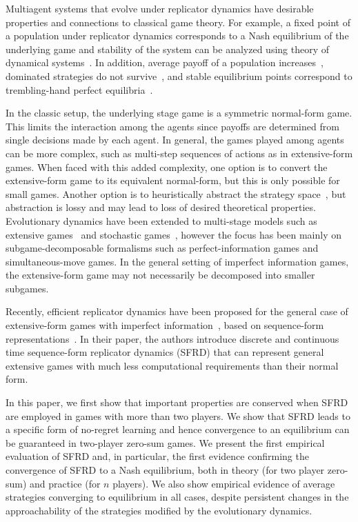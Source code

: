 \documentclass{aamas2014}
\begin{document}
Multiagent systems that evolve under replicator dynamics have desirable properties and connections to classical game theory. 
For example, a fixed point of a population under replicator dynamics corresponds to a Nash equilibrium of the underlying  
game and stability of the system can be analyzed using theory of dynamical systems~\cite{FudLev98,Gintis09}. 
In addition, average payoff of a population increases~\cite{HS98}, dominated strategies do not survive~\cite{Gintis09}, and 
stable equilibrium points correspond to trembling-hand perfect equilibria~\cite{FudLev98,ShoLB08}.

In the classic setup, the underlying stage game is a symmetric normal-form game. This limits the interaction
among the agents since payoffs are determined from single decisions made by each agent. In general, the games played among agents 
can be more complex, such as multi-step sequences of actions as in extensive-form games. 
When faced with this added complexity, one option is to convert the extensive-form game to its equivalent normal-form, 
but this is only possible for small games. 
Another option is to heuristically abstract the strategy space~\cite{ponsen09b}, but 
abstraction is lossy and may lead to loss of desired theoretical properties.
Evolutionary dynamics have been extended to 
multi-stage models such as extensive games~\cite{Cressman03} and stochastic games~\cite{Flesch13Evolutionary,Hennes09State}, 
however the focus has been mainly on subgame-decomposable formalisms such as perfect-information games and
simultaneous-move games. In the general setting of imperfect information games, the extensive-form game may not necessarily 
be decomposed into smaller subgames. 

Recently, efficient replicator dynamics have been proposed for the general case of extensive-form games with 
imperfect information~\cite{Gatti13Efficient}, based on sequence-form representations~\cite{SequenceFormLPs}. 
In their paper, the authors introduce discrete and continuous time sequence-form replicator dynamics (SFRD)
that can represent general extensive games with much less computational requirements than their 
normal form. 

In this paper, we first show that important properties are conserved when SFRD are employed in games with more than 
two players. We show that SFRD leads to a specific form of no-regret learning and hence convergence to an 
equilibrium can be guaranteed in two-player zero-sum games.
We present the first empirical evaluation of SFRD and, in particular, the first evidence confirming the convergence 
of SFRD to a Nash equilibrium, both in theory (for two player zero-sum) and practice (for $n$ players).
We also show empirical evidence of average strategies converging to equilibrium in all cases, despite persistent  
changes in the approachability of the strategies modified by the evolutionary dynamics. 
\end{document}
